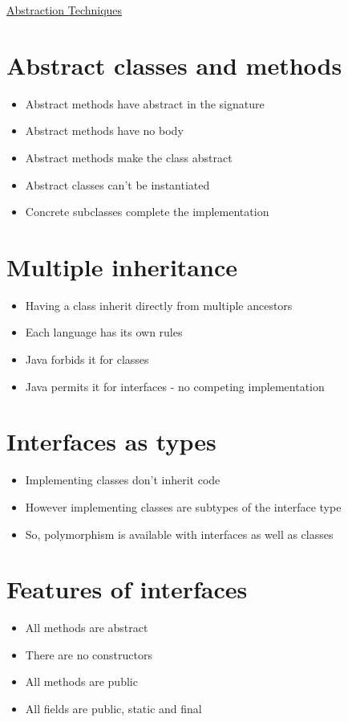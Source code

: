 \documentclass{article}[18pt]
\begin{document}
\begin{center}
\underline{\huge Abstraction Techniques}
\end{center}
\section{Abstract classes and methods}
\begin{itemize}
	\item Abstract methods have abstract in the signature
	\item Abstract methods have no body
	\item Abstract methods make the class abstract
	\item Abstract classes can't be instantiated
	\item Concrete subclasses complete the implementation
\end{itemize}
\section{Multiple inheritance}
\begin{itemize}
	\item Having a class inherit directly from multiple ancestors
	\item Each language has its own rules
	\item Java forbids it for classes
	\item Java permits it for interfaces - no competing implementation
\end{itemize}
\section{Interfaces as types}
\begin{itemize}
	\item Implementing classes don't inherit code
	\item However implementing classes are subtypes of the interface type
	\item So, polymorphism is available with interfaces as well as classes
\end{itemize}
\section{Features of interfaces}
\begin{itemize}
	\item All methods are abstract
	\item There are no constructors
	\item All methods are public
	\item All fields are public, static and final
\end{itemize}
\end{document}
